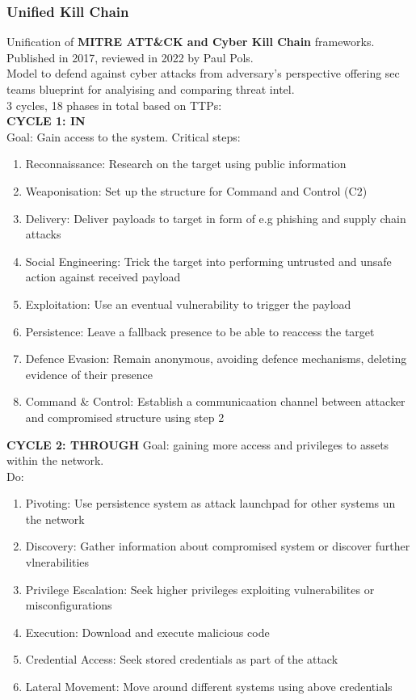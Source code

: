 \subsubsection*{Unified Kill Chain}
Unification of \textbf{MITRE ATT\&CK and Cyber Kill Chain} frameworks.\\
Published in 2017, reviewed in 2022 by Paul Pols.\\
Model to defend against cyber attacks from adversary's perspective offering sec teams blueprint for analyising and comparing threat intel.\\
3 cycles, 18 phases in total based on TTPs:\\

\textbf{CYCLE 1: IN}\\
Goal: Gain access to the system.
Critical steps: 
\begin{enumerate}
\item Reconnaissance: Research on the target using public information
\item Weaponisation: Set up the structure for Command and Control (C2)
\item Delivery: Deliver payloads to target in form of e.g phishing and supply chain attacks
\item Social Engineering: Trick the target into performing untrusted and unsafe action against received payload
\item Exploitation: Use an eventual vulnerability to trigger the payload
\item Persistence: Leave a fallback presence to be able to reaccess the target
\item Defence Evasion: Remain anonymous, avoiding defence mechanisms, deleting evidence of their presence
\item Command \& Control: Establish a communicaation channel between attacker and compromised structure using step 2
\end{enumerate}

\textbf{CYCLE 2: THROUGH}
Goal: gaining more access and privileges to assets within the network.\\
Do: 
\begin{enumerate}
\item Pivoting: Use persistence system as attack launchpad for other systems un the network
\item Discovery: Gather information about compromised system or discover further vlnerabilities
\item Privilege Escalation: Seek higher privileges exploiting vulnerabilites or misconfigurations
\item Execution: Download and execute malicious code\
\item Credential Access: Seek stored credentials as part of the attack
\item Lateral Movement: Move around different systems using above credentials
\end{enumerate}

